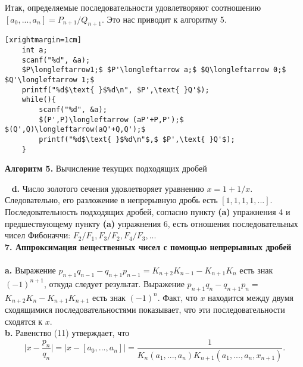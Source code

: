 \noindent Итак, определяемые последовательности удовлетворяют соотношению\linebreak
$[a_0,...,a_n]=P_{n+1}/Q_{n+1}.$ \quad Это нас приводит к алгоритму 5.
\begin{center}
\begin{lstlisting}[mathescape=true][xrightmargin=1cm]
	int a;
	scanf("%d", &a);
	$P\longleftarrow1;$ $P'\longleftarrow a;$ $Q\longleftarrow 0;$ $Q'\longleftarrow 1;$
	printf("%d$\text{ }$%d\n", $P',\text{ }Q'$);
	while(){
		scanf("%d", &a);
		$(P',P)\longleftarrow (aP'+P,P');$ $(Q',Q)\longleftarrow(aQ'+Q,Q');$
		printf("%d$\text{ }$%d\n"$,$ $P',\text{ }Q'$);
	}
\end{lstlisting}
\textbf{Алгоритм 5.} Вычисление текущих подходящих дробей
\end{center}
\ \linebreak
\hspace*{15pt}\textbf{d.} Число золотого сечения удовлетворяет уравнению $x=1+1/x$.\linebreak
Следовательно, его разложение в непрерывную дробь есть $[1,1,1,1,...]$.
Последовательность подходящих дробей, согласно пункту \textbf{(a)} упражне­ния 4\linebreak
и предшествующему пункту \textbf{(a)} упражнения 6, есть отношения\linebreak
последовательных чисел Фибоначчи: $F_2/F_1,F_3/F_2,F_4/F_3,...$\newline
\\
\noindent\textbf{7. Аппроксимация вещественных чисел с помощью \newline \hspace*{13pt}непрерывных дробей}\\
\\
\hspace*{15pt}\textbf{a.} Выражение $p_{n+1}q_{n-1}-q_{n+1}p_{n-1}=K_{n+2}K_{n-1}-K_{n+1}K_n$ есть знак\linebreak 
$(-1)^{n+1}$, откуда следует результат. Выражение $p_{n+1}q_n-q_{n+1}p_n=$\linebreak
$K_{n+2}K_n-K_{n+1}K_{n+1}$ есть знак $(-1)^n$. Факт, что $x$ находится между двумя сходящимися последовательностями показывает, что эти последовательности сходятся к $x$.\newline
\\
\hspace*{15pt}\textbf{b.} Равенство (11) утверждает, что
$$\Bigg|x-\frac{p_n}{q_n}\Bigg| = \big|x-[a_0,...,a_n]\big|=\frac{1}{K_n(a_1,...,a_n)K_{n+1}(a_1,...,a_n,x_{n+1})}.$$\newpage


